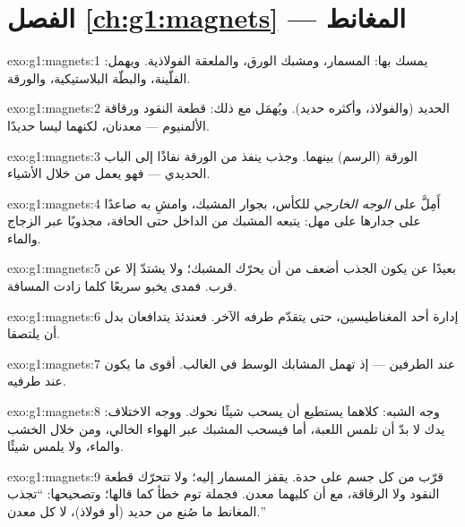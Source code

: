 \section*{الفصل \ref{ch:g1:magnets} --- المغانط}

\begin{solution}{exo:g1:magnets:1}
يمسك بها: المسمار، ومشبك الورق، والملعقة الفولاذية. ويهمل:
الفلّينة، والبطّة البلاستيكية، والورقة.
\end{solution}

\begin{solution}{exo:g1:magnets:2}
الحديد (والفولاذ، وأكثره حديد). ويُهمَل مع ذلك: قطعة النقود
ورقاقة الألمنيوم --- معدنان، لكنهما ليسا حديدًا.
\end{solution}

\begin{solution}{exo:g1:magnets:3}
الورقة (الرسم) بينهما. وجذب  ينفذ من الورقة نفاذًا إلى
الباب الحديدي --- فهو يعمل من خلال الأشياء.
\end{solution}

\begin{solution}{exo:g1:magnets:4}
أَمِلَّ  على \emph{الوجه الخارجي} للكأس، بجوار المشبك،
وامشِ به صاعدًا على جدارها على مهل: يتبعه المشبك من الداخل حتى
الحافة، مجذوبًا عبر الزجاج والماء.
\end{solution}

\begin{solution}{exo:g1:magnets:5}
بعيدًا عن  يكون الجذب أضعف من أن يحرّك المشبك؛ ولا
يشتدّ إلا عن قرب. فمدى  يخبو سريعًا كلما زادت المسافة.
\end{solution}

\begin{solution}{exo:g1:magnets:6}
إدارة أحد المغناطيسين، حتى يتقدّم طرفه الآخر. فعندئذ يتدافعان
بدل أن يلتصقا.
\end{solution}

\begin{solution}{exo:g1:magnets:7}
عند الطرفين --- إذ تهمل المشابك الوسط في الغالب.  أقوى
ما يكون عند طرفيه.
\end{solution}

\begin{solution}{exo:g1:magnets:8}
وجه الشبه: كلاهما يستطيع أن يسحب شيئًا نحوك. ووجه الاختلاف: يدك
لا بدّ أن تلمس اللعبة، أما  فيسحب المشبك عبر الهواء
الخالي، ومن خلال الخشب والماء، ولا يلمس شيئًا.
\end{solution}

\begin{solution}{exo:g1:magnets:9}
قرّب  من كل جسم على حدة. يقفز المسمار إليه؛ ولا تتحرّك
قطعة النقود ولا الرقاقة، مع أن كليهما معدن. فجملة توم خطأ كما
قالها؛ وتصحيحها: ``تجذب المغانط ما صُنع من حديد (أو فولاذ)، لا
كل معدن.''
\end{solution}
